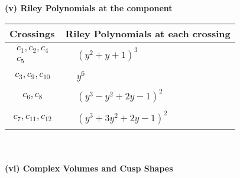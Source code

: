 \documentclass[1p]{elsarticle_modified}
\theoremstyle{definition}
\begin{document}
\newpage\renewcommand{\arraystretch}{1}
\flushleft \textbf{(v) Riley Polynomials at the component}\newline \\
\begin{tabular}{m{50pt}|m{274pt}}
Crossings & \hspace{64pt}Riley Polynomials at each crossing \\
\hline $$\begin{aligned}c_{1},c_{2},c_{4}\\c_{5}\end{aligned}$$&$\begin{aligned}
&(y^2+y+1)^3
\end{aligned}$\\
\hline $$\begin{aligned}c_{3},c_{9},c_{10}\end{aligned}$$&$\begin{aligned}
&y^6
\end{aligned}$\\
\hline $$\begin{aligned}c_{6},c_{8}\end{aligned}$$&$\begin{aligned}
&(y^3- y^2+2 y-1)^2
\end{aligned}$\\
\hline $$\begin{aligned}c_{7},c_{11},c_{12}\end{aligned}$$&$\begin{aligned}
&(y^3+3 y^2+2 y-1)^2
\end{aligned}$\\
\hline
\end{tabular}\\~\\
\newpage\flushleft \textbf{(vi) Complex Volumes and Cusp Shapes}
\end{document}
